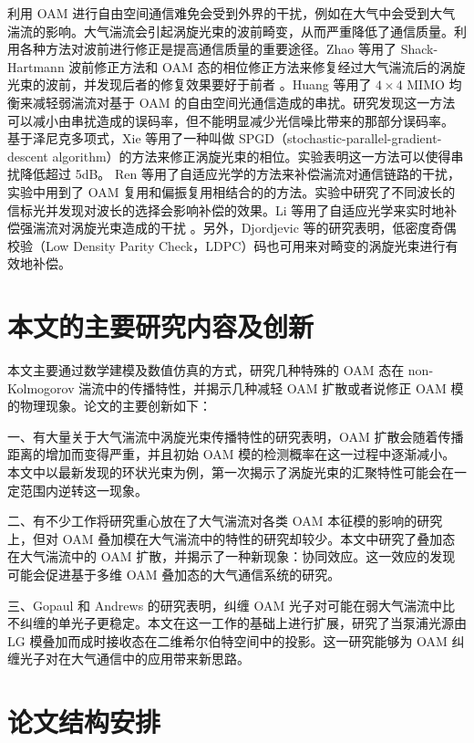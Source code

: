 \documentclass[master]{thesis-uestc}
\begin{document}
利用 OAM 进行自由空间通信难免会受到外界的干扰，例如在大气中会受到大气湍流的影响。大气湍流会引起涡旋光束的波前畸变，从而严重降低了通信质量。利用各种方法对波前进行修正是提高通信质量的重要途径。Zhao 等用了 Shack-Hartmann 波前修正方法和 OAM 态的相位修正方法来修复经过大气湍流后的涡旋光束的波前，并发现后者的修复效果要好于前者            。Huang 等用了 $4\times4$ MIMO 均衡来减轻弱湍流对基于 OAM 的自由空间光通信造成的串扰。研究发现这一方法可以减小由串扰造成的误码率，但不能明显减少光信噪比带来的那部分误码率。 基于泽尼克多项式，Xie 等用了一种叫做 SPGD（stochastic-parallel-gradient-descent algorithm）的方法来修正涡旋光束的相位。实验表明这一方法可以使得串扰降低超过 5dB。 Ren 等用了自适应光学的方法来补偿湍流对通信链路的干扰，实验中用到了 OAM 复用和偏振复用相结合的的方法。实验中研究了不同波长的信标光并发现对波长的选择会影响补偿的效果。Li 等用了自适应光学来实时地补偿强湍流对涡旋光束造成的干扰 。另外，Djordjevic 等的研究表明，低密度奇偶校验（Low Density Parity Check，LDPC）码也可用来对畸变的涡旋光束进行有效地补偿。


\section{本文的主要研究内容及创新}
本文主要通过数学建模及数值仿真的方式，研究几种特殊的 OAM 态在 non-Kolmogorov 湍流中的传播特性，并揭示几种减轻 OAM 扩散或者说修正 OAM 模的物理现象。论文的主要创新如下：

一、有大量关于大气湍流中涡旋光束传播特性的研究表明，OAM 扩散会随着传播距离的增加而变得严重，并且初始 OAM 模的检测概率在这一过程中逐渐减小。本文中以最新发现的环状光束为例，第一次揭示了涡旋光束的汇聚特性可能会在一定范围内逆转这一现象。

二、有不少工作将研究重心放在了大气湍流对各类 OAM 本征模的影响的研究上，但对 OAM 叠加模在大气湍流中的特性的研究却较少。本文中研究了叠加态在大气湍流中的 OAM 扩散，并揭示了一种新现象：协同效应。这一效应的发现可能会促进基于多维 OAM 叠加态的大气通信系统的研究。

三、Gopaul 和 Andrews 的研究表明，纠缠 OAM 光子对可能在弱大气湍流中比不纠缠的单光子更稳定。本文在这一工作的基础上进行扩展，研究了当泵浦光源由 LG 模叠加而成时接收态在二维希尔伯特空间中的投影。这一研究能够为 OAM 纠缠光子对在大气通信中的应用带来新思路。

 \section{论文结构安排}
\end{document}
